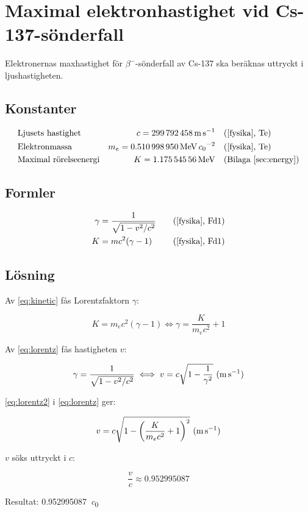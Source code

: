 \section{Maximal elektronhastighet vid Cs-137-sönderfall} \label{sec:speed}

Elektronernas maxhastighet för $\beta^-$-sönderfall av Cs-137 ska beräknas
uttryckt i ljushastigheten.

\subsection*{Konstanter}

\begin{align*}
    & \text{Ljusets hastighet}     & c   = \qty{299792458}{\m\per\s}                  &\quad \text{(\cite{fysika}, Te)}   \\
    & \text{Elektronmassa}         & m_e = \qty{0.510998950}{\MeV\per\clight\squared} &\quad \text{(\cite{fysika}, Te)}   \\
    & \text{Maximal rörelseenergi} & K   = \qty{1.17554556}{\MeV}                     &\quad \text{(Bilaga~\ref{sec:energy})}
\end{align*}

\subsection*{Formler}

\begin{align}
    \gamma &= \frac{1}{\sqrt{1 - v^2/c^2}} &\quad \text{(\cite{fysika}, Fd1)} \label{eq:lorentz} \\
         K &= mc^2(\gamma - 1)             &\quad \text{(\cite{fysika}, Fd1)} \label{eq:kinetic}
\end{align}

\subsection*{Lösning}

Av \eqref{eq:kinetic} fås Lorentzfaktorn $\gamma$:

\begin{equation}
    K = m_e c^2(\gamma - 1) \iff \gamma = \frac{K}{m_e c^2} + 1 \label{eq:lorentz2}
\end{equation}

Av \eqref{eq:lorentz} fås hastigheten $v$:

\begin{equation}
    \gamma = \frac{1}{\sqrt{1 - v^2/c^2}} \iff v = c \sqrt{1 - \frac{1}{\gamma^2}}~\text{(\unit{\m\per\s})} \label{eq:speed}
\end{equation}

\eqref{eq:lorentz2} i \eqref{eq:lorentz} ger:

\begin{equation}
    v = c \sqrt{1 - \left( \frac{K}{m_e c^2} + 1 \right)^2}~\text{(\unit{\m\per\s})}
\end{equation}

$v$ söks uttryckt i $c$:

\begin{equation}
    \frac{v}{c} \approx \num{0.952995087}
\end{equation}

Resultat: \qty{0.952995087}{\clight}
